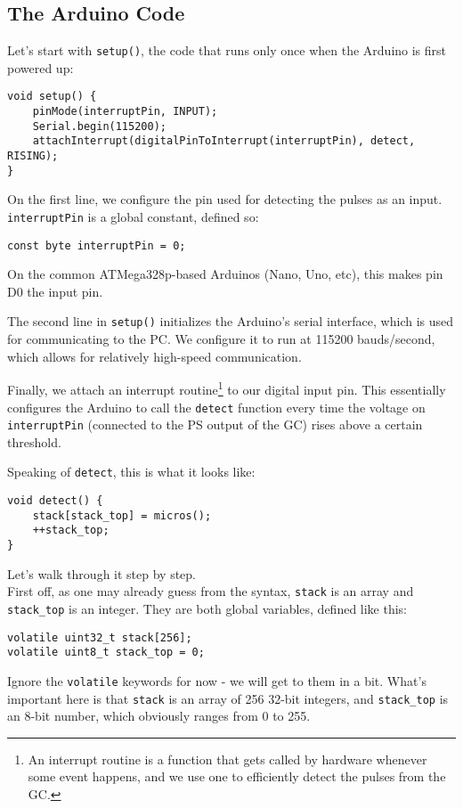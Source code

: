\documentclass[11pt]{article}
\begin{document}
\subsection{The Arduino Code}
\label{sec:orgfc3b887}
Let's start with \texttt{setup()}, the code that runs only once when the Arduino is first powered up:
\begin{verbatim}
void setup() {
    pinMode(interruptPin, INPUT);
    Serial.begin(115200);
    attachInterrupt(digitalPinToInterrupt(interruptPin), detect, RISING);
}
\end{verbatim}
On the first line, we configure the pin used for detecting the pulses as an input. \texttt{interruptPin} is a global constant, defined so:
\begin{verbatim}
const byte interruptPin = 0;
\end{verbatim}
On the common ATMega328p-based Arduinos (Nano, Uno, etc), this makes pin D0 the input pin.

The second line in \texttt{setup()} initializes the Arduino's serial interface, which is used for communicating to the PC. We configure it to run at 115200 bauds/second, which allows for relatively high-speed communication.

Finally, we attach an interrupt routine\footnote{An interrupt routine is a function that gets called by hardware whenever some event happens, and we use one to efficiently detect the pulses from the GC.} to our digital input pin. This essentially configures the Arduino to call the \texttt{detect} function every time the voltage on \texttt{interruptPin} (connected to the PS output of the GC) rises above a certain threshold. 

Speaking of \texttt{detect}, this is what it looks like:

\begin{verbatim}
void detect() {
    stack[stack_top] = micros();
    ++stack_top;
}
\end{verbatim}

Let's walk through it step by step.\\
First off, as one may already guess from the syntax, \texttt{stack} is an array and \texttt{stack\_top} is an integer. They are both global variables, defined like this:

\begin{verbatim}
volatile uint32_t stack[256];
volatile uint8_t stack_top = 0;
\end{verbatim}

Ignore the \texttt{volatile} keywords for now - we will get to them in a bit. What's important here is that \texttt{stack} is an array of 256 32-bit integers, and \texttt{stack\_top} is an 8-bit number, which obviously ranges from 0 to 255.
\end{document}
